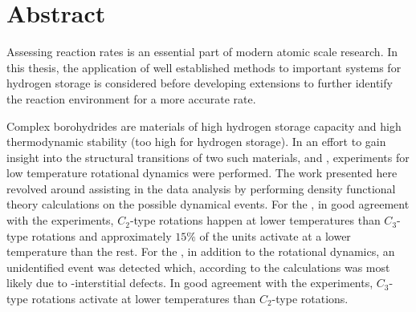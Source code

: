 \chapter*{Abstract}

Assessing reaction rates is an essential part of modern atomic scale research.
In this thesis, the application of well established methods to important systems for hydrogen storage is considered before developing extensions to further identify the reaction environment for a more accurate rate.

Complex borohydrides are materials of high hydrogen storage capacity and high thermodynamic stability (too high for hydrogen storage).
In an effort to gain insight into the structural transitions of two such materials,  and , experiments for low temperature rotational dynamics were performed.
The work presented here revolved around assisting in the data analysis by performing density functional theory calculations on the possible dynamical events.
For the , in good agreement with the experiments, $C_2$-type rotations happen at lower temperatures than $C_3$-type rotations and approximately $15\%$ of the  units activate at a lower temperature than the rest.
For the , in addition to the rotational dynamics, an unidentified event was detected which, according to the calculations was most likely due to -interstitial defects.
In good agreement with the experiments, $C_3$-type rotations activate at lower temperatures than $C_2$-type rotations.

